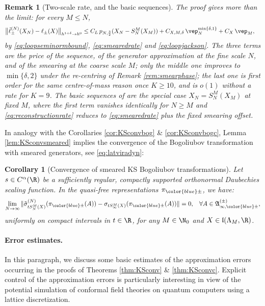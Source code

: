 \documentclass[a4paper, 11pt]{article}
\newcommand{\fA}{\mathfrak{A}}\newcommand{\cA}{\mathcal{A}}\newcommand{\dA}{\mathds{A}}\newcommand{\sA}{\mathscr{A}}
\newcommand{\fl}{\mathfrak{l}}\newcommand{\cl}{\mathcal{l}}
\DeclareMathOperator{\1}{\mathds{1}}
\newtheorem{cor}[thm]{Corollary}
\newtheorem{rem}[thm]{Remark}
\begin{document}
\begin{rem}[Two-scale rate, and the basic sequences]
\label{rem:reconstructionrate}
The proof gives more than the limit: for every $M\leq N$,
\begin{align}
\label{eq:reconstructionrate}
\big\|\tilde{\ell}^{(N)}_{\pm}(X_{N})-\ell_{\pm}(X)\big\|_{h^{1+\delta}\rightarrow h^{0}} & \leq C_{L}\!\ p_{N,\frac{3}{2}}(X_{N}-S^{M}_{N}(X_{M}))+C_{X,M,\delta}\!\ \vep_{N}^{\min\{\delta,1\}}+C_{X}\!\ \vep_{M},
\end{align}
by \eqref{eq:loopseminormbound}, \eqref{eq:smearedrate} and \eqref{eq:loopjackson}. The three terms are the price of the sequence, of the generator approximation at the fine scale $N$, and of the smearing at the coarse scale $M$; only the middle one improves to $\min\{\delta,2\}$ under the re-centring of Remark \ref{rem:smearphase}; the last one is first order for the same centre-of-mass reason once $K\geq10$, and is $o(1)$ without a rate for $K=9$. The basic sequences of \cite{DuffieldMeanFieldDynamical} are the special case $X_{N} = S^{M}_{N}(X_{M})$ at fixed $M$, where the first term vanishes identically for $N\geq M$ and \eqref{eq:reconstructionrate} reduces to \eqref{eq:smearedrate} plus the fixed smearing offset.
\end{rem}
In analogy with the Corollaries \ref{cor:KSconvbog} \& \ref{cor:KSconvbogc}, Lemma \ref{lem:KSconvsmeared} implies the convergence of the Bogoliubov transformation with smeared generators, see \eqref{eq:latviradyn}:
\begin{cor}[Convergence of smeared KS Bogoliubov transformations]
\label{cor:KSconvbogsmeared}
Let $s\in C^{\alpha}(\R)$ be a sufficiently regular, compactly supported orthonormal Daubechies scaling function. In the quasi-free representations $\pi_{{\color{blue}\pm}}$, we have:
\begin{align*}
\lim_{N\rightarrow\infty}\|\tilde{\sigma}^{(N)}_{tS^{M}_{N}(X)}(\pi_{{\color{blue}\pm}}(A)) - \sigma_{tS^{M}_{\infty}(X)}(\pi_{{\color{blue}\pm}}(A))\| & = 0, & \forall A\in\fA^{(\pm)}_{\infty,{\color{blue}\pm}},
\end{align*}
uniformly on compact intervals in $t\in\R$, for any $M\in\N_{0}$ and $X\in\fl(\Lambda_{M},\R)$.
\end{cor}

\paragraph{Error estimates.}
In this paragraph, we discuss some basic estimates of the approximation errors occurring in the proofs of Theorems \ref{thm:KSconv} \& \ref{thm:KSconvc}. Explicit control of the approximation errors is particularly interesting in view of the potential simulation of conformal field theories on quantum computers using a lattice discretization.
\end{document}
